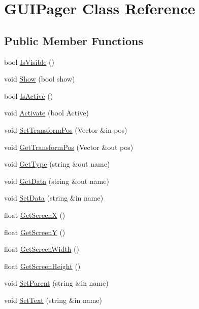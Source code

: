 \hypertarget{class_g_u_i_pager}{}\section{G\+U\+I\+Pager Class Reference}
\label{class_g_u_i_pager}
\subsection*{Public Member Functions}
\begin{DoxyCompactItemize}
\item 
bool \hyperlink{class_g_u_i_pager_a21109d07d268cc890d8afdac5c8908c0}{Is\+Visible} ()
\item 
void \hyperlink{class_g_u_i_pager_a324c3a460899427e871eeb1fdcaf3fae}{Show} (bool show)
\item 
bool \hyperlink{class_g_u_i_pager_a00580fe0d18d1cb58283e8b6dcd709b3}{Is\+Active} ()
\item 
void \hyperlink{class_g_u_i_pager_a4a871a0b91470f044db70270c75f666e}{Activate} (bool Active)
\item 
void \hyperlink{class_g_u_i_pager_af311b1267e6bd06ea10287824c063c3e}{Set\+Transform\+Pos} (Vector \&in pos)
\item 
void \hyperlink{class_g_u_i_pager_aae2bd03930b3010d724def60f39a6e9f}{Get\+Transform\+Pos} (Vector \&out pos)
\item 
void \hyperlink{class_g_u_i_pager_ac157fffcad04420ec6a7174866211031}{Get\+Type} (string \&out name)
\item 
void \hyperlink{class_g_u_i_pager_a88ae24d3ba8c4d200ccb5d1e0b99c266}{Get\+Data} (string \&out name)
\item 
void \hyperlink{class_g_u_i_pager_af6cc0b00d4bf521192142c01626b7f90}{Set\+Data} (string \&in name)
\item 
float \hyperlink{class_g_u_i_pager_ac5b8b425dbc8e907e7277bfcda59d011}{Get\+ScreenX} ()
\item 
float \hyperlink{class_g_u_i_pager_a6c6792b4e06a3ab3281ec5a25312f93d}{Get\+ScreenY} ()
\item 
float \hyperlink{class_g_u_i_pager_acd202cb9efb6bf4db191e7baafe8cd31}{Get\+Screen\+Width} ()
\item 
float \hyperlink{class_g_u_i_pager_a219d53215f256042bcc8ab60a86894d7}{Get\+Screen\+Height} ()
\item 
void \hyperlink{class_g_u_i_pager_a7b54fed44f099b0e133e410ab7f56ff5}{Set\+Parent} (string \&in name)
\item 
void \hyperlink{class_g_u_i_pager_a6c9df01d049cb8e88f3a7f95d6bf6600}{Set\+Text} (string \&in name)

\end{DoxyCompactItemize}

